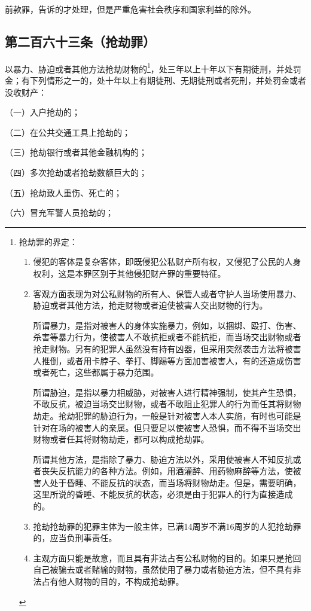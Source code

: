 \documentclass[utf-8,10pt]{ctexart}
\begin{document}
前款罪，告诉的才处理，但是严重危害社会秩序和国家利益的除外。
\subsection{第二百六十三条（抢劫罪）}
以暴力、胁迫或者其他方法抢劫财物的\footnote{
抢劫罪的界定：
\begin{enumerate}
\item 侵犯的客体是复杂客体，即既侵犯公私财产所有权，又侵犯了公民的人身权利，这是本罪区别于其他侵犯财产罪的重要特征。
\item 客观方面表现为对公私财物的所有人、保管人或者守护人当场使用暴力、胁迫或者其他方法，抢走财物或者迫使被害人交出财物的行为。

    所谓暴力，是指对被害人的身体实施暴力，例如，以捆绑、殴打、伤害、杀害等暴力行为，使被害人不敢抗拒或者不能抗拒，而当场交出财物或者抢走财物。另有的犯罪人虽然没有持有凶器，但采用突然袭击方法将被害人推倒，或者用卡脖子、拳打、脚踢等方面加害被害人，有的还造成伤害或者死亡，这些都属于暴力范围。

    所谓胁迫，是指以暴力相威胁，对被害人进行精神强制，使其产生恐惧，不敢反抗，被迫当场交出财物，或者不敢阻止犯罪人的行为而任其将财物劫走。抢劫犯罪的胁迫行为，一般是针对被害人本人实施，有时也可能是针对在场的被害人的亲属。但只要足以使被害人恐惧，而不得不当场交出财物或者任其将财物劫走，都可以构成抢劫罪。

    所谓其他方法，是指除了暴力、胁迫方法以外，采用使被害人不知反抗或者丧失反抗能力的各种方法。例如，用酒灌醉、用药物麻醉等方法，使被害人处于昏睡、不能反抗的状态，而当场将财物劫走。但是，需要明确，这里所说的昏睡、不能反抗的状态，必须是由于犯罪人的行为直接造成的。
\item 抢劫抢劫罪的犯罪主体为一般主体，已满14周岁不满16周岁的人犯抢劫罪的，应当负刑事责任。
\item 主观方面只能是故意，而且具有非法占有公私财物的目的。如果只是抢回自己被骗去或者赌输的财物，虽然使用了暴力或者胁迫方法，但不具有非法占有他人财物的目的，不构成抢劫罪。
\end{enumerate}
}，处三年以上十年以下有期徒刑，并处罚金；有下列情形之一的，处十年以上有期徒刑、无期徒刑或者死刑，并处罚金或者没收财产：

（一）入户抢劫的；

（二）在公共交通工具上抢劫的；

（三）抢劫银行或者其他金融机构的；

（四）多次抢劫或者抢劫数额巨大的；

（五）抢劫致人重伤、死亡的；

（六）冒充军警人员抢劫的；
\end{document}
